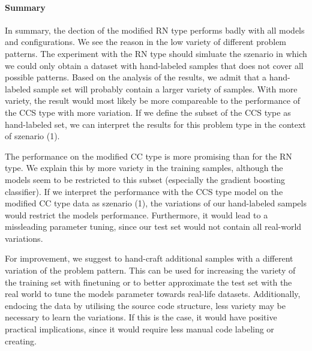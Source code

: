 \paragraph{Summary}
In summary, the dection of the modified RN type performs badly with all models and configurations. We see the reason in the low variety of different problem patterns. The experiment with the RN type should simluate the szenario in which we could only obtain a dataset with hand-labeled samples that does not cover all possible patterns. Based on the analysis of the results, we admit that a hand-labeled sample set will probably contain a larger variety of samples. With more variety, the result would most likely be more compareable to the performance of the CCS type with more variation. If we define the subset of the CCS type as hand-labeled set, we can interpret the results for this problem type in the context of szenario (1). 

The performance on the modified CC type is more promising than for the RN type. We explain this by more variety in the training samples, although the models seem to be restricted to this subset (especially the gradient boosting classifier). If we interpret the performance with the CCS type model on the modified CC type data as szenario (1), the variations of our hand-labeled sampels would restrict the models performance. Furthermore, it would lead to a missleading parameter tuning, since our test set would not contain all real-world variations.

For improvement, we suggest to hand-craft additional samples with a different variation of the problem pattern. This can be used for increasing the variety of the training set with finetuning or to better approximate the test set with the real world to tune the models parameter towards real-life datasets. Additionally, endocing the data by utilising the source code structure, less variety may be necessary to learn the variations. If this is the case, it would have positive practical implications, since it would require less manual code labeling or creating.




